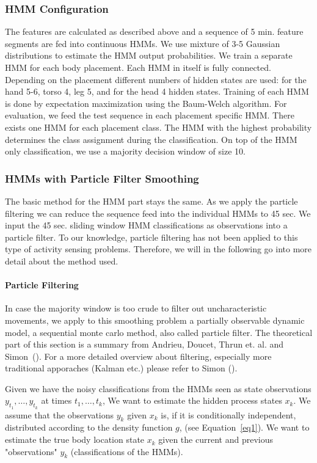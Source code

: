 \subsubsection{HMM Configuration}
The features are calculated as described above and a sequence of 5
min. feature segments are fed into continuous HMMs.  We use mixture
of 3-5 Gaussian distributions to estimate the HMM output
probabilities.  We train a separate HMM for each body placement.  Each
HMM in itself is fully connected. Depending on the placement
different numbers of hidden states are used: for the hand 5-6, torso 4, leg 5,
and for the head 4 hidden states. Training of each HMM is done by expectation maximization
using the Baum-Welch algorithm.  For evaluation, we feed the test
sequence in each placement specific HMM. There exists one HMM for each placement class. 
The HMM with the highest probability determines
the class assignment during the classification.  On top of the HMM only
classification, we use a majority decision window of size 10.

\subsubsection{HMMs with Particle Filter Smoothing}
The basic method for the HMM part stays the same. As we apply the
particle filtering we can reduce the sequence feed into the
individual HMMs to 45 sec. We input the 45 sec. sliding window HMM
classifications as observations into a particle filter. 
To our knowledge, particle filtering has not been applied
to this type of activity sensing problems.
Therefore, we will in the following go into more detail about
the method used.

\paragraph{Particle Filtering}

In case the majority window is too crude to filter out uncharacteristic
movements, we apply to this smoothing problem a  
partially observable dynamic model, a sequential monte carlo method, 
also called particle filter. The
theoretical part of this section is a summary from Andrieu, Doucet,
Thrun et. al. and Simon~(\cite{Andrieu:2003wb,Doucet:2001vx,Thrun:2001wc,Simon:2006p11115}). 
For a more detailed overview about filtering, especially more traditional
apporaches (Kalman etc.) please refer to Simon (\cite{Simon:2006p11115}).


Given we have the noisy classifications from the HMMs seen as
state observations  $y_{t_1},\ldots,y_{t_k}$ 
at times $t_1,\ldots,t_k$,  We want to estimate the hidden process states $x_{k}$.
We assume that the observations $y_k$ given $x_k$ is, if it is conditionally independent, distributed
according to the density function $g$, (see Equation~\ref{eq1}). 
We want to estimate the true body location state $x_{k}$ given the current and previous
"observations" $y_{k}$ (classifications of the HMMs).

